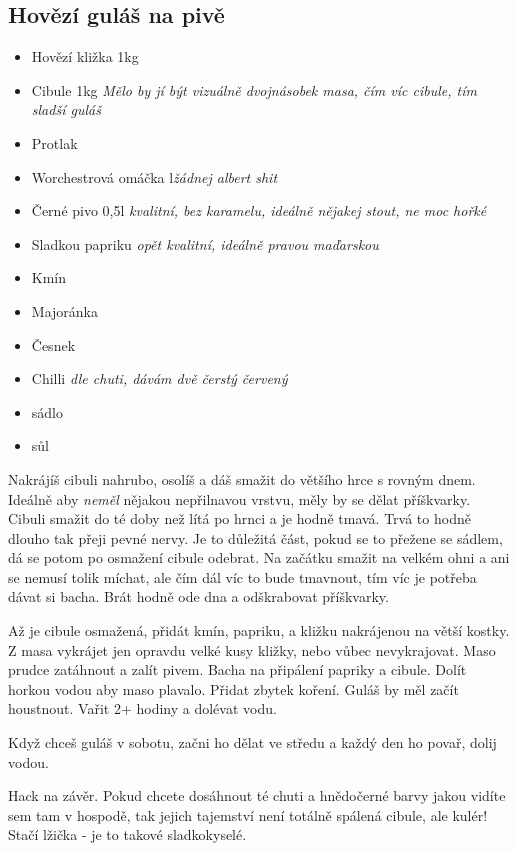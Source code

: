 \documentclass[10pt,a4paper]{article}
\newenvironment{myitemize}
{ \begin{itemize}
    \setlength{\itemsep}{0pt}
    \setlength{\parskip}{0pt}
    \setlength{\parsep}{0pt}     }
{ \end{itemize}                  }
\begin{document}
\subsection{Hovězí guláš na pivě}
\begin{minipage}[t]{0,5\textwidth}
\begin{myitemize} 
\item Hovězí kližka 1kg
\item Cibule 1kg \textit{Mělo by jí být vizuálně dvojnásobek masa, čím víc cibule, tím sladší guláš}
\item Protlak
\item Worchestrová omáčka l\textit{žádnej albert shit}
\item Černé pivo 0,5l \emph{kvalitní, bez karamelu, ideálně nějakej stout, ne moc hořké}
\item Sladkou papriku \emph{opět kvalitní, ideálně pravou maďarskou} 
\item Kmín
\item Majoránka
\item Česnek
\item Chilli \textit{dle chuti, dávám dvě čerstý červený}
\item sádlo
\item sůl
\end{myitemize}
\end{minipage}
\begin{minipage}[t]{0,5\textwidth}
Nakrájíš cibuli nahrubo, osolíš a dáš smažit do většího hrce s rovným dnem. Ideálně aby \textit{neměl} nějakou nepřilnavou vrstvu, měly by se dělat příškvarky. Cibuli smažit do té doby než lítá po hrnci a je hodně tmavá. Trvá to hodně dlouho tak přeji pevné nervy. Je to důležitá část, pokud se to přežene se sádlem, dá se potom po osmažení cibule odebrat. Na začátku smažit na velkém ohni a ani se nemusí tolik míchat, ale čím dál víc to bude tmavnout, tím víc je potřeba dávat si bacha. Brát hodně ode dna a odškrabovat příškvarky.

Až je cibule osmažená, přidát kmín, papriku, a kližku nakrájenou na větší kostky. Z masa vykrájet jen opravdu velké kusy kližky, nebo vůbec nevykrajovat. Maso prudce zatáhnout a zalít pivem. Bacha na připálení papriky a cibule. Dolít horkou vodou aby maso plavalo. Přidat zbytek koření. Guláš by měl začít houstnout. Vařit 2+ hodiny a dolévat vodu.

Když chceš guláš v sobotu, začni ho dělat ve středu a každý den ho povař, dolij vodou.

Hack na závěr. Pokud chcete dosáhnout té chuti a hnědočerné barvy jakou vidíte sem tam v hospodě, tak jejich tajemství není totálně spálená cibule, ale kulér! Stačí lžička - je to takové sladkokyselé.


\end{minipage}
\end{document}
